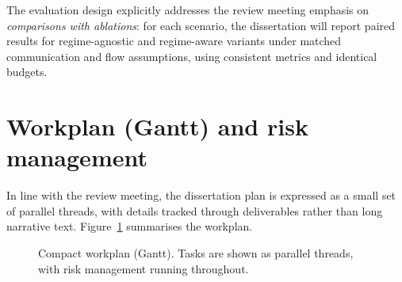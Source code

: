 \noindent The evaluation design explicitly addresses the review meeting emphasis on \emph{comparisons with ablations}: for each scenario, the dissertation will report
paired results for regime-agnostic and regime-aware variants under matched communication and flow assumptions, using consistent metrics and identical budgets.

\section{Workplan (Gantt) and risk management} \label{sec:workplan}

In line with the review meeting, the dissertation plan is expressed as a small set of parallel threads, with details tracked through deliverables rather than long narrative text.
Figure~\ref{fig:gantt_compact} summarises the workplan.


\begin{figure}[H]
\centering


\caption{Compact workplan (Gantt). Tasks are shown as parallel threads, with risk management running throughout.}
\label{fig:gantt_compact}
\end{figure}


